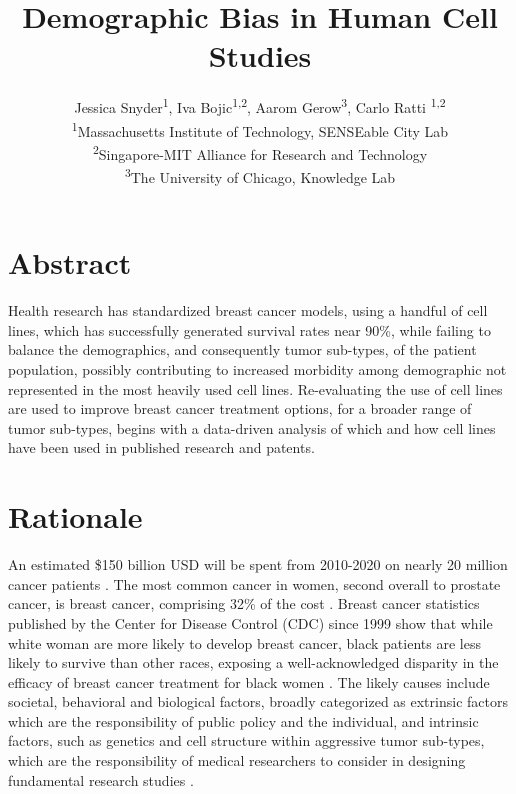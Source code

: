 \documentclass[11pt]{article}
\begin{document}
\title{Demographic Bias in Human Cell Studies }
\author{Jessica Snyder\textsuperscript{1}, Iva Bojic\textsuperscript{1,2}, Aarom Gerow\textsuperscript{3}, Carlo Ratti  \textsuperscript{1,2 } \\ \textsuperscript{1}Massachusetts Institute of Technology, SENSEable City Lab \\ \textsuperscript{2}Singapore-MIT Alliance for Research and Technology \\  \textsuperscript{3}The University of Chicago, Knowledge Lab }

\maketitle

\section{Abstract}
Health research has standardized breast cancer models, using a handful of cell lines, which has successfully generated survival rates near 90\%, while failing to balance the demographics, and consequently tumor sub-types, of the patient population, possibly contributing to increased morbidity among demographic not represented in the most heavily used cell lines. Re-evaluating the use of cell lines are used to improve breast cancer treatment options, for a broader range of tumor sub-types, begins with a data-driven analysis of which and how cell lines have been used in published research and patents. 

\section{Rationale}

An estimated \$150 billion USD will be spent from 2010-2020 on nearly 20 million cancer patients \cite{mariotto2011projections}. The most common cancer in women, second overall to prostate cancer, is breast cancer, comprising 32\% of the cost \cite{mariotto2011projections}. Breast cancer statistics published by the Center for Disease Control (CDC) since 1999 show that while white woman are more likely to develop breast cancer, black patients are less likely to survive than other races, exposing a well-acknowledged disparity in the efficacy of breast cancer treatment for black women \cite{greenlee2000cancer, berkman2014racial}. The likely causes include societal, behavioral and biological factors, broadly categorized as extrinsic factors which are the responsibility of public policy and the individual, and intrinsic factors, such as genetics and cell structure within aggressive tumor sub-types, which are the responsibility of medical researchers to consider in designing fundamental research studies \cite{reding2012examination, brennan2012there}. 
\end{document}
